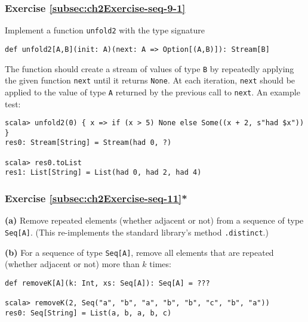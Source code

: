 \subsubsection{Exercise \label{subsec:ch2Exercise-seq-9-1}\ref{subsec:ch2Exercise-seq-9-1}}

Implement a function
\lstinline!unfold2! with the type signature
\begin{lstlisting}
def unfold2[A,B](init: A)(next: A => Option[(A,B)]): Stream[B]
\end{lstlisting}
The function should create a stream of values of type \lstinline!B!
by repeatedly applying the given function \lstinline!next! until
it returns \lstinline!None!. At each iteration, \lstinline!next!
should be applied to the value of type \lstinline!A! returned by
the previous call to \lstinline!next!. An example test:
\begin{lstlisting}
scala> unfold2(0) { x => if (x > 5) None else Some((x + 2, s"had $x")) }
res0: Stream[String] = Stream(had 0, ?)

scala> res0.toList
res1: List[String] = List(had 0, had 2, had 4) 
\end{lstlisting}
\begin{comment}
\begin{lstlisting}
def unfold2[A,B](init: A)(next: A => Option[(A,B)]): Stream[B] = next(init) match {
   case None => Stream()
   case Some((a, b)) => Stream.cons(b, unfold2(a)(next))
}
\end{lstlisting}
\end{comment}


\subsubsection{Exercise \label{subsec:ch2Exercise-seq-11}\ref{subsec:ch2Exercise-seq-11}{*}}

\textbf{(a)} Remove repeated elements (whether adjacent or not) from
a sequence of type \lstinline!Seq[A]!. (This re-implements the standard
library's method \lstinline!.distinct!.)

\textbf{(b)} For a sequence of type \lstinline!Seq[A]!, remove all
elements that are repeated (whether adjacent or not) more than $k$
times:
\begin{lstlisting}
def removeK[A](k: Int, xs: Seq[A]): Seq[A] = ???

scala> removeK(2, Seq("a", "b", "a", "b", "b", "c", "b", "a"))
res0: Seq[String] = List(a, b, a, b, c)
\end{lstlisting}


